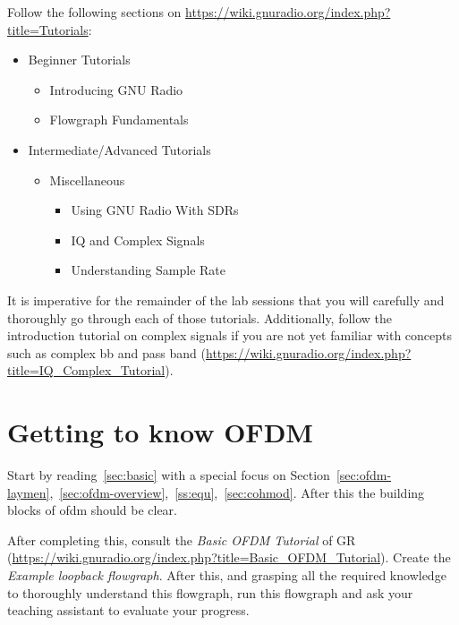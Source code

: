 Follow the following sections on \url{https://wiki.gnuradio.org/index.php?title=Tutorials}:
\begin{itemize}
    \item Beginner Tutorials
    \begin{itemize}
         \item Introducing GNU Radio
         \item Flowgraph Fundamentals
    \end{itemize}
    \item Intermediate/Advanced Tutorials
    \begin{itemize}
        \item Miscellaneous
        \begin{itemize}
            \item Using GNU Radio With SDRs
            \item IQ and Complex Signals
            \item Understanding Sample Rate
        \end{itemize}


    \end{itemize}
   
\end{itemize}
It is imperative for the remainder of the lab sessions that you will carefully and thoroughly go through each of those tutorials. Additionally, follow the introduction tutorial on complex signals if you are not yet familiar with concepts such as complex \gls{bb} and pass band (\url{https://wiki.gnuradio.org/index.php?title=IQ_Complex_Tutorial}). 



\section{Getting to know OFDM}
Start by reading~\cref{sec:basic} with a special focus on Section~\ref{sec:ofdm-laymen},~\ref{sec:ofdm-overview},~\ref{ss:equ},~\ref{sec:cohmod}.
After this the building blocks of \gls{ofdm} should be clear. 

After completing this, consult the \textit{Basic OFDM Tutorial} of GR (\url{https://wiki.gnuradio.org/index.php?title=Basic_OFDM_Tutorial}). Create the \textit{Example loopback flowgraph}. After this, and grasping all the required knowledge to thoroughly understand this flowgraph, run this flowgraph and ask your teaching assistant to evaluate your progress.



